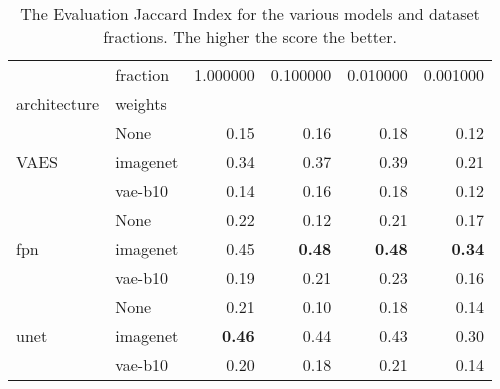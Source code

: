 \begin{table}[ht]
\caption{The Evaluation Jaccard Index for the various models and dataset fractions. The higher the score the better.}
\label{tab:data_fraction_results}
\begin{tabular}{llrrrr}
\toprule
 & fraction & 1.000000 & 0.100000 & 0.010000 & 0.001000 \\
architecture & weights &  &  &  &  \\
\midrule
\multirow[c]{3}{*}{VAES} & None & 0.15 & 0.16 & 0.18 & 0.12 \\
 & imagenet & 0.34 & 0.37 & 0.39 & 0.21 \\
 & vae-b10 & 0.14 & 0.16 & 0.18 & 0.12 \\
\multirow[c]{3}{*}{fpn} & None & 0.22 & 0.12 & 0.21 & 0.17 \\
 & imagenet & 0.45 & \textbf{0.48} & \textbf{0.48} & \textbf{0.34} \\
 & vae-b10 & 0.19 & 0.21 & 0.23 & 0.16 \\
\multirow[c]{3}{*}{unet} & None & 0.21 & 0.10 & 0.18 & 0.14 \\
 & imagenet & \textbf{0.46} & 0.44 & 0.43 & 0.30 \\
 & vae-b10 & 0.20 & 0.18 & 0.21 & 0.14 \\
\bottomrule
\end{tabular}
\end{table}
